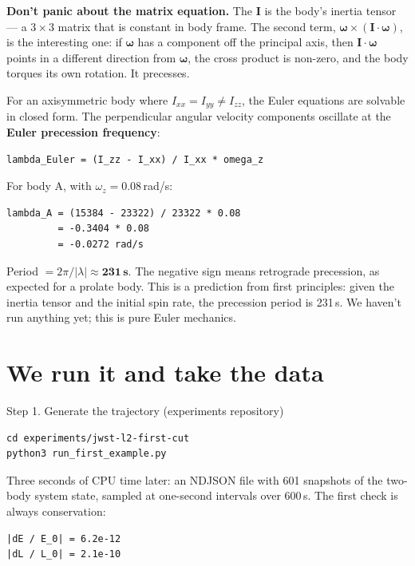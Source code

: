 \documentclass[11pt,a4paper,openany]{book}
\begin{document}
\textbf{Don't panic about the matrix equation.} The $\mathbf{I}$ is the body's
inertia tensor --- a $3\times 3$ matrix that is constant in body frame. The
second term, $\boldsymbol{\omega} \times (\mathbf{I} \cdot \boldsymbol{\omega})$,
is the interesting one: if $\boldsymbol{\omega}$ has a component off the
principal axis, then $\mathbf{I} \cdot \boldsymbol{\omega}$ points in a
different direction from $\boldsymbol{\omega}$, the cross product is non-zero,
and the body torques its own rotation. It precesses.

For an axisymmetric body where $I_{xx} = I_{yy} \neq I_{zz}$, the Euler
equations are solvable in closed form. The perpendicular angular velocity
components oscillate at the \textbf{Euler precession frequency}:
\begin{lstlisting}[style=shaddata]
lambda_Euler = (I_zz - I_xx) / I_xx * omega_z
\end{lstlisting}

For body A, with $\omega_z = 0.08$\,rad/s:
\begin{lstlisting}[style=shaddata]
lambda_A = (15384 - 23322) / 23322 * 0.08
         = -0.3404 * 0.08
         = -0.0272 rad/s
\end{lstlisting}

Period $= 2\pi / |\lambda| \approx \mathbf{231\,s}$. The negative sign means
retrograde precession, as expected for a prolate body. This is a prediction
from first principles: given the inertia tensor and the initial spin rate, the
precession period is 231\,s. We haven't run anything yet; this is pure Euler
mechanics.

\section{We run it and take the data}

\begin{pipelinestep}{Step 1. Generate the trajectory (experiments repository)}
\begin{lstlisting}[style=shaddata]
cd experiments/jwst-l2-first-cut
python3 run_first_example.py
\end{lstlisting}
\end{pipelinestep}

Three seconds of CPU time later: an NDJSON file with 601 snapshots of the
two-body system state, sampled at one-second intervals over 600\,s. The
first check is always conservation:
\begin{lstlisting}[style=shaddata]
|dE / E_0| = 6.2e-12
|dL / L_0| = 2.1e-10
\end{lstlisting}
\end{document}
